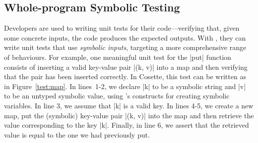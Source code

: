 

\subsection{Whole-program Symbolic Testing}
\label{subsec:st}

Developers are used to writing unit tests for their code---verifying that, given some concrete inputs, the code produces the expected outputs. With \cosette, they can write unit tests that use \emph{symbolic inputs}, targeting a more comprehensive range of behaviours. For example, one meaningful unit test for the \jsinline|put| function consists of inserting a valid key-value pair \jsinline|(k, v)| into a map and then verifying that the pair has been inserted correctly. In Cosette, this test can be written as in Figure~\ref{test:map}. In lines~1-2, we declare \jsinline|k| to be a symbolic string and \jsinline|v| to be an untyped symbolic value, using \cosette's constructs for creating symbolic variables. In line 3, we assume that \jsinline|k| is a valid key. In lines 4-5, we create a new map, put the (symbolic) key-value pair \jsinline|(k, v)| into the map and then retrieve the value corresponding to the key \jsinline|k|. Finally, in line 6, we assert that the retrieved value is equal to the one we had previously put.

